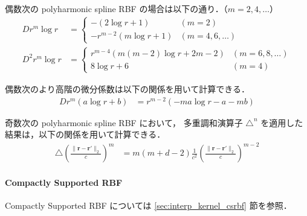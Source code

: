 偶数次の polyharmonic spline RBF の場合は以下の通り．（$m = 2, 4, \ldots$）
\begin{align}
    D r^m \log{r}   & =
    \begin{cases}
        -\left(2 \log{r} + 1\right)         & (m = 2)            \\
        -r^{m-2} \left(m \log{r} + 1\right) & (m = 4, 6, \ldots)
    \end{cases}
    \\
    D^2 r^m \log{r} & =
    \begin{cases}
        r^{m-4} \left(m(m-2) \log{r} + 2m-2\right) & (m = 6, 8, \ldots) \\
        8 \log{r} + 6                              & (m = 4)
    \end{cases}
\end{align}

偶数次のより高階の微分係数は以下の関係を用いて計算できる．
\begin{align}
    D r^m (a \log{r} + b) & = r^{m-2} \left(-m a \log{r} -a -m b\right)
\end{align}

奇数次の polyharmonic spline RBF において，
多重調和演算子
$\triangle^n$ を適用した結果は，以下の関係を用いて計算できる．
\begin{align}
    \triangle \left(\frac{\|\bm{r} - \bm{r}'\|_2}{c}\right)^m & =
    m (m + d - 2) \frac{1}{c^2} \left(\frac{\|\bm{r} - \bm{r}'\|_2}{c}\right)^{m-2}
\end{align}

\paragraph{Compactly Supported RBF}
Compactly Supported RBF については \ref{sec:interp_kernel_csrbf} 節を参照．
